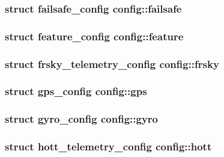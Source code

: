 \hypertarget{structconfig_ab701fb6479e6aca9f3670653d28f6e5d}{
\subsubsection[{failsafe}]{\setlength{\rightskip}{0pt plus 5cm}struct {\bf failsafe\+\_\+config} config\+::failsafe}}\label{structconfig_ab701fb6479e6aca9f3670653d28f6e5d}
\hypertarget{structconfig_a90fec35d296ce999424add0fae6cb3cc}{
\subsubsection[{feature}]{\setlength{\rightskip}{0pt plus 5cm}struct {\bf feature\+\_\+config} config\+::feature}}\label{structconfig_a90fec35d296ce999424add0fae6cb3cc}
\hypertarget{structconfig_a4635fa51252ac9c251be101e6c40da11}{
\subsubsection[{frsky}]{\setlength{\rightskip}{0pt plus 5cm}struct {\bf frsky\+\_\+telemetry\+\_\+config} config\+::frsky}}\label{structconfig_a4635fa51252ac9c251be101e6c40da11}
\hypertarget{structconfig_a2fbe394304ddf4aee7a8a44dd2b35cf4}{
\subsubsection[{gps}]{\setlength{\rightskip}{0pt plus 5cm}struct {\bf gps\+\_\+config} config\+::gps}}\label{structconfig_a2fbe394304ddf4aee7a8a44dd2b35cf4}
\hypertarget{structconfig_a0a9d3790f18b6caa8864884b85521da1}{
\subsubsection[{gyro}]{\setlength{\rightskip}{0pt plus 5cm}struct {\bf gyro\+\_\+config} config\+::gyro}}\label{structconfig_a0a9d3790f18b6caa8864884b85521da1}
\hypertarget{structconfig_ac2155b993a124aacbc1370bad1e20666}{
\subsubsection[{hott}]{\setlength{\rightskip}{0pt plus 5cm}struct {\bf hott\+\_\+telemetry\+\_\+config} config\+::hott}}\label{structconfig_ac2155b993a124aacbc1370bad1e20666}
